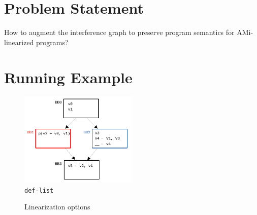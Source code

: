 \documentclass[12pt]{article}
\begin{document}
\section{Problem Statement}

How to augment the interference graph to preserve program semantics for AMi-linearized programs?

\pagebreak

\section{Running Example}

\begin{figure}[h!]
  \centering
  \includegraphics[width=0.5\textwidth]{examples/cfg}
  \caption{\texttt{def-list} }
\end{figure}

\begin{figure}[h!]
  \centering
   \hfill
  \caption{Linearization options}
  \label{fig:linearization-options}
\end{figure}
\end{document}
